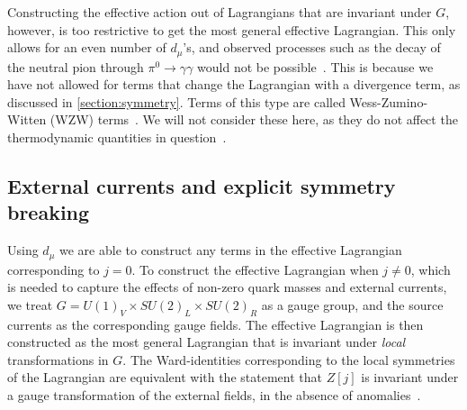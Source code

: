 Constructing the effective action out of Lagrangians that are invariant under $G$, however, is too restrictive to get the most general effective Lagrangian.
This only allows for an even number of $d_\mu$'s, and observed processes such as the decay of the neutral pion through $\pi^0 \rightarrow \gamma \gamma$ would not be possible~\cite{Scherer2002IntroductionTC}.
This is because we have not allowed for terms that change the Lagrangian with a divergence term, as discussed in \autoref{section:symmetry}.
Terms of this type are called Wess-Zumino-Witten (WZW) terms~\cite{weinberg_1996_vol2}.
We will not consider these here, as they do not affect the thermodynamic quantities in question~\cite{Andersen:two-flavor-chpt}.

\subsection*{External currents and explicit symmetry breaking}
\label{Covarinat derivative}

Using $d_\mu$ we are able to construct any terms in the effective Lagrangian corresponding to $j=0$.
To construct the effective Lagrangian when $j \neq 0$, which is needed to capture the effects of non-zero quark masses and external currents, we treat $G =  U(1)_V \times SU(2)_L\times SU(2)_R$ as a gauge group, and the source currents as the corresponding gauge fields.
The effective Lagrangian is then constructed as the most general Lagrangian that is invariant under \emph{local} transformations in $G$.
The Ward-identities corresponding to the local symmetries of the Lagrangian are equivalent with the statement that $Z[j]$ is invariant under a gauge transformation of the external fields, in the absence of anomalies~\cite{Leutwyler:on_the_fundations}.

